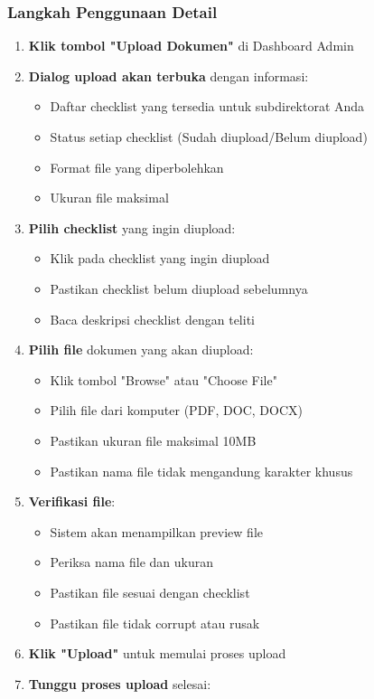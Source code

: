 \documentclass[12pt,a4paper]{article}
\begin{document}
\subsubsection{Langkah Penggunaan Detail}
\begin{enumerate}
\item \textbf{Klik tombol "Upload Dokumen"} di Dashboard Admin
\item \textbf{Dialog upload akan terbuka} dengan informasi:
\begin{itemize}
\item Daftar checklist yang tersedia untuk subdirektorat Anda
\item Status setiap checklist (Sudah diupload/Belum diupload)
\item Format file yang diperbolehkan
\item Ukuran file maksimal
\end{itemize}
\item \textbf{Pilih checklist} yang ingin diupload:
\begin{itemize}
\item Klik pada checklist yang ingin diupload
\item Pastikan checklist belum diupload sebelumnya
\item Baca deskripsi checklist dengan teliti
\end{itemize}
\item \textbf{Pilih file} dokumen yang akan diupload:
\begin{itemize}
\item Klik tombol "Browse" atau "Choose File"
\item Pilih file dari komputer (PDF, DOC, DOCX)
\item Pastikan ukuran file maksimal 10MB
\item Pastikan nama file tidak mengandung karakter khusus
\end{itemize}
\item \textbf{Verifikasi file}:
\begin{itemize}
\item Sistem akan menampilkan preview file
\item Periksa nama file dan ukuran
\item Pastikan file sesuai dengan checklist
\item Pastikan file tidak corrupt atau rusak
\end{itemize}
\item \textbf{Klik "Upload"} untuk memulai proses upload
\item \textbf{Tunggu proses upload} selesai:

\end{enumerate}
\end{document}
